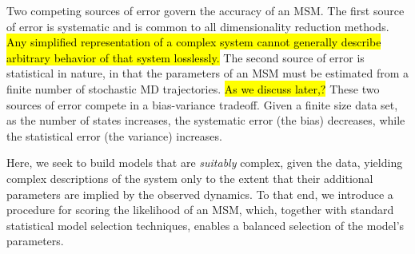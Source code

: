 \documentclass[journal=jpcbfk, layout=traditional, manuscript=article]{achemso}
\begin{document}

Two competing sources of error govern the accuracy of an MSM. The first source of error is systematic and is common to all dimensionality reduction methods. \hl{Any simplified representation of a complex system cannot generally describe arbitrary behavior of that system losslessly.} The second source of error is statistical in nature, in that the parameters of an MSM must be estimated from a finite number of stochastic MD trajectories. \hl{As we discuss later,?} These two sources of error compete in a bias-variance tradeoff\cite{bias_variance_paper}. Given a finite size data set, as the number of states increases, the systematic error (the bias) decreases, while the statistical error (the variance) increases.

Here, we seek to build models that are \emph{suitably} complex, given the data, yielding complex descriptions of the system only to the extent that their additional parameters are implied by the observed dynamics. To that end, we introduce a procedure for scoring the likelihood of an MSM, which, together with standard statistical model selection techniques, enables a balanced selection of the model's parameters. 
\end{document}
